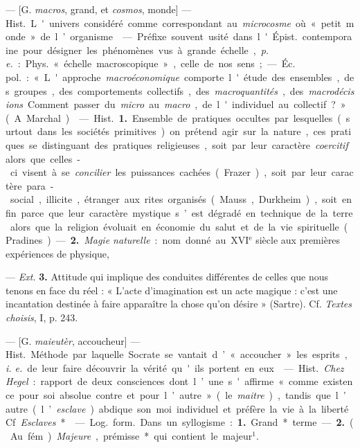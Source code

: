 
	\begin{itemize}[leftmargin=1cm, label=, itemsep=1pt]

 — [G. {\it macros}, grand, et {\it cosmos}, monde] — \si{Hist.} L'univers considéré comme correspondant au
{\it microcosme} où « petit monde » de l’organisme.

 — Préfixe souvent usité dans l'\si{Épist.} contemporaine pour
désigner les phénomènes vus à grande échelle, {\it p. e.} : \si{Phys.}
« échelle macroscopique », celle de nos sens ; — \si{Éc. pol.} : « L'approche
{\it macroéconomique} comporte l'étude des ensembles, des groupes, des
comportements collectifs, des {\it macroquantités}, des
{\it macrodécisions}... Comment passer du {\it micro} au {\it macro}, de
l'individuel au collectif ? » (A. Marchal).

 — \si{Hist.} {\bf 1.} Ensemble de pratiques occultes par
lesquelles (surtout dans les sociétés primitives) on prétend agir sur la
nature, ces pratiques se distinguant des pratiques religieuses, soit par leur
caractère {\it coercitif} alors que celles-ci visent à se {\it concilier} les
puissances cachées (Frazer), soit par leur caractère para-social, illicite,
étranger aux rites organisés (Mauss, Durkheim), soit enfin parce que leur
caractère mystique s’est dégradé en technique de la terre alors que la
religion évoluait en économie du salut et de la vie spirituelle (Pradines). —
{\bf 2.} {\it Magie naturelle} : nom donné au {\footnotesize XVI}$^\text{e}$
siècle aux premières expériences de physique,

— {\it Ext.} {\bf 3.} Attitude qui implique des conduites différentes de
celles que nous tenons en face du réel : « L’acte d'imagination est un acte
magique : c’est une incantation destinée à faire apparaître la chose qu’on
désire » (Sartre). Cf. {\it Textes choisis}, I, p. 243.

 — [G. {\it maieutèr}, accoucheur] — \si{Hist.} Méthode par
laquelle Socrate se vantait d’ « accoucher » les esprits, {\it i. e.} de leur
faire découvrir la vérité qu'ils portent en eux.

 — \si{Hist.} {\it Chez Hegel} : rapport de deux
consciences dont l’une s'affirme « comme existence pour soi absolue contre et
pour l’autre » (le {\it maitre}), tandis que l’autre (l’{\it esclave})
abdique son moi individuel et préfère la vie à la liberté. Cf.
{\it Esclaves}*.

 — \si{Log.} \si{form.} Dans un syllogisme : {\bf 1.} Grand*
terme. — {\bf 2.} (Au fém.). {\it Majeure}, prémisse* qui contient le
majeur$^1$.


\end{itemize}
